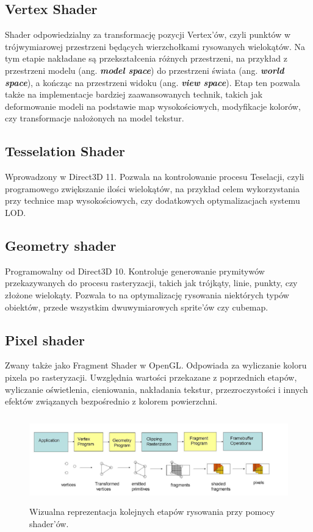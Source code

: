 \subsection{Vertex Shader}
Shader odpowiedzialny za transformację pozycji Vertex'ów, czyli punktów
w trójwymiarowej przestrzeni będących wierzchołkami rysowanych
wielokątów. Na tym etapie nakładane są przekształcenia różnych
przestrzeni, na przykład z przestrzeni modelu (ang. \emph{\textbf{model
		space}}) do przestrzeni świata (ang. \emph{\textbf{world space}}), a
kończąc na przestrzeni widoku (ang. \emph{\textbf{view space}}). Etap ten pozwala także na implementacje bardziej zaawansowanych technik,
takich jak deformowanie modeli na podstawie map wysokościowych,
modyfikacje kolorów, czy transformacje nałożonych na model tekstur.

\subsection{Tesselation Shader}
Wprowadzony w Direct3D 11. Pozwala na kontrolowanie procesu Teselacji,
czyli programowego zwiększanie ilości wielokątów, na przykład celem
wykorzystania przy technice map wysokościowych, czy dodatkowych
optymalizacjach systemu LOD.

\subsection{Geometry shader}
Programowalny od Direct3D 10. Kontroluje generowanie prymitywów
przekazywanych do procesu rasteryzacji, takich jak trójkąty, linie,
punkty, czy złożone wielokąty. Pozwala to na optymalizację rysowania
niektórych typów obiektów, przede wszystkim dwuwymiarowych sprite'ów czy
cubemap.

\subsection{Pixel shader}
Zwany także jako Fragment Shader w OpenGL. Odpowiada za wyliczanie
koloru pixela po rasteryzacji. Uwzględnia wartości przekazane z
poprzednich etapów, wyliczanie oświetlenia, cieniowania, nakładania
tekstur, przezroczystości i innych efektów związanych bezpośrednio z
kolorem powierzchni.

\begin{figure}[htbp] %
	\centering
	\includegraphics[width=5.34091in,height=1.48711in]{images/19_shader_pipeline.png}
	\caption{Wizualna reprezentacja kolejnych etapów rysowania przy pomocy shader'ów. \cite{researchgate:openglpipeline:2024}}
	\label{fig:shader_pipeline} %
\end{figure}

